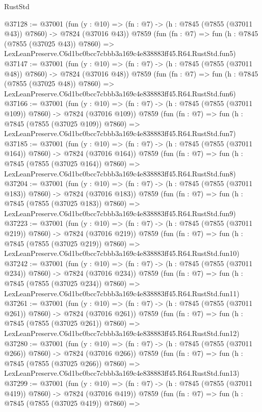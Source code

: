 \begin{lexlean}{RustStd}
\begin{coremodule}
@37128 := @37001
    (fun (y : @10) => (fn : @7) -> (h : @7845 (@7855 (@37011 @43)) @7860) -> @7824 (@37016 @43))
    @7859
    (fun (fn : @7) =>
    fun (h : @7845 (@7855 (@37025 @43)) @7860) =>
    LexLeanPreserve.C6d1bc0bcc7cbbb3a169c4e838883ff45.R64.RustStd.fun5)
@37147 := @37001
    (fun (y : @10) => (fn : @7) -> (h : @7845 (@7855 (@37011 @48)) @7860) -> @7824 (@37016 @48))
    @7859
    (fun (fn : @7) =>
    fun (h : @7845 (@7855 (@37025 @48)) @7860) =>
    LexLeanPreserve.C6d1bc0bcc7cbbb3a169c4e838883ff45.R64.RustStd.fun6)
@37166 := @37001
    (fun (y : @10) => (fn : @7) -> (h : @7845 (@7855 (@37011 @109)) @7860) -> @7824 (@37016 @109))
    @7859
    (fun (fn : @7) =>
    fun (h : @7845 (@7855 (@37025 @109)) @7860) =>
    LexLeanPreserve.C6d1bc0bcc7cbbb3a169c4e838883ff45.R64.RustStd.fun7)
@37185 := @37001
    (fun (y : @10) => (fn : @7) -> (h : @7845 (@7855 (@37011 @164)) @7860) -> @7824 (@37016 @164))
    @7859
    (fun (fn : @7) =>
    fun (h : @7845 (@7855 (@37025 @164)) @7860) =>
    LexLeanPreserve.C6d1bc0bcc7cbbb3a169c4e838883ff45.R64.RustStd.fun8)
@37204 := @37001
    (fun (y : @10) => (fn : @7) -> (h : @7845 (@7855 (@37011 @183)) @7860) -> @7824 (@37016 @183))
    @7859
    (fun (fn : @7) =>
    fun (h : @7845 (@7855 (@37025 @183)) @7860) =>
    LexLeanPreserve.C6d1bc0bcc7cbbb3a169c4e838883ff45.R64.RustStd.fun9)
@37223 := @37001
    (fun (y : @10) => (fn : @7) -> (h : @7845 (@7855 (@37011 @219)) @7860) -> @7824 (@37016 @219))
    @7859
    (fun (fn : @7) =>
    fun (h : @7845 (@7855 (@37025 @219)) @7860) =>
    LexLeanPreserve.C6d1bc0bcc7cbbb3a169c4e838883ff45.R64.RustStd.fun10)
@37242 := @37001
    (fun (y : @10) => (fn : @7) -> (h : @7845 (@7855 (@37011 @234)) @7860) -> @7824 (@37016 @234))
    @7859
    (fun (fn : @7) =>
    fun (h : @7845 (@7855 (@37025 @234)) @7860) =>
    LexLeanPreserve.C6d1bc0bcc7cbbb3a169c4e838883ff45.R64.RustStd.fun11)
@37261 := @37001
    (fun (y : @10) => (fn : @7) -> (h : @7845 (@7855 (@37011 @261)) @7860) -> @7824 (@37016 @261))
    @7859
    (fun (fn : @7) =>
    fun (h : @7845 (@7855 (@37025 @261)) @7860) =>
    LexLeanPreserve.C6d1bc0bcc7cbbb3a169c4e838883ff45.R64.RustStd.fun12)
@37280 := @37001
    (fun (y : @10) => (fn : @7) -> (h : @7845 (@7855 (@37011 @266)) @7860) -> @7824 (@37016 @266))
    @7859
    (fun (fn : @7) =>
    fun (h : @7845 (@7855 (@37025 @266)) @7860) =>
    LexLeanPreserve.C6d1bc0bcc7cbbb3a169c4e838883ff45.R64.RustStd.fun13)
@37299 := @37001
    (fun (y : @10) => (fn : @7) -> (h : @7845 (@7855 (@37011 @419)) @7860) -> @7824 (@37016 @419))
    @7859
    (fun (fn : @7) =>
    fun (h : @7845 (@7855 (@37025 @419)) @7860) =>

\end{coremodule}
\end{lexlean}
